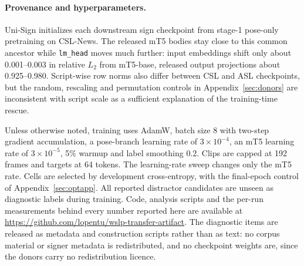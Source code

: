 \documentclass[11pt]{article}
\begin{document}
\paragraph{Provenance and hyperparameters.}
Uni-Sign initializes each downstream sign checkpoint from stage-1 pose-only
pretraining on CSL-News. The released mT5 bodies stay close to this common
ancestor while \texttt{lm\_head} moves much further: input embeddings shift only
about 0.001--0.003 in relative $L_2$ from mT5-base, released output projections
about 0.925--0.980. Script-wise row norms also differ between CSL and ASL
checkpoints, but the random, rescaling and permutation controls in
Appendix~\ref{sec:donors} are inconsistent with script scale as a sufficient
explanation of the training-time rescue.

Unless otherwise noted, training uses AdamW, batch size 8 with two-step gradient
accumulation, a pose-branch learning rate of $3\times10^{-4}$, an mT5 learning
rate of $3\times10^{-5}$, 5\% warmup and label smoothing 0.2. Clips are capped at
192 frames and targets at 64 tokens. The learning-rate sweep changes only the mT5
rate. Cells are selected by development cross-entropy, with the final-epoch
control of Appendix~\ref{sec:optapp}. All reported distractor candidates are
unseen as diagnostic labels during training.
Code, analysis scripts and the per-run measurements behind every number reported
here are available at \url{https://github.com/lopentu/wslp-transfer-artifact}.
The diagnostic items are released as metadata and construction scripts rather
than as text: no corpus material or signer metadata is redistributed, and no
checkpoint weights are, since the donors carry no redistribution licence.
\end{document}
